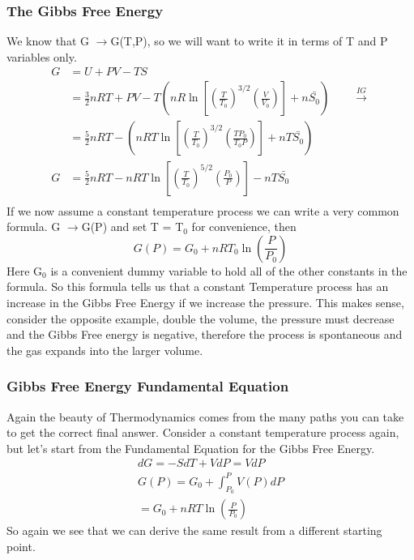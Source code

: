 \documentclass{article}
\begin{document}
\subsubsection*{The Gibbs Free Energy}
We know that G $\rightarrow$G(T,P), so we will want to write it in terms of T and P variables only. 
\begin{equation}
    \begin{split}
        G &= U + PV - TS \\
        &= \frac{3}{2}nRT + PV - T \left(nR\ln\left[ \left(\frac{T}{T_0} \right)^{3/2} \left(\frac{V}{V_0} \right) \right ] + n\bar{S_0}\right) \qquad \xrightarrow{IG}\\
        &= \frac{5}{2}nRT - \left(nRT\ln\left[ \left(\frac{T}{T_0} \right)^{3/2} \left(\frac{T P_0}{T_0 P} \right) \right ] + nT\bar{S_0}\right) \\
        G &= \frac{5}{2}nRT -nRT\ln\left[ \left(\frac{T}{T_0} \right)^{5/2} \left(\frac{ P_0}{P} \right) \right ] - nT\bar{S_0} \\
    \end{split}
\end{equation}
If we now assume a constant temperature process we can write a very common formula. 
G $\rightarrow$G(P) and set T = T$_0$ for convenience, then
\begin{equation}
    G(P) = G_0 + nRT_0\ln\left(\frac{P}{P_0}\right)
\end{equation}
Here G$_0$ is a convenient dummy variable to hold all of the other constants in the formula. 
So this formula tells us that a constant Temperature process has an increase in the Gibbs Free Energy if we increase the pressure. 
This makes sense, consider the opposite example, double the volume, the pressure must decrease and the Gibbs Free energy is negative, therefore the process is spontaneous and the gas expands into the larger volume. 

\subsubsection*{Gibbs Free Energy Fundamental Equation}
Again the beauty of Thermodynamics comes from the many paths you can take to get the correct final answer. 
Consider a constant temperature process again, but let's start from the Fundamental Equation for the Gibbs Free Energy. 
\begin{equation}
    \begin{split}
        dG = -SdT + VdP = VdP \\
        G(P) = G_0 + \int_{P_0}^P V(P)dP \\
        = G_0 + nRT\ln\left(\frac{P}{P_0}\right)
    \end{split}
\end{equation}
So again we see that we can derive the same result from a different starting point. 
\end{document}
